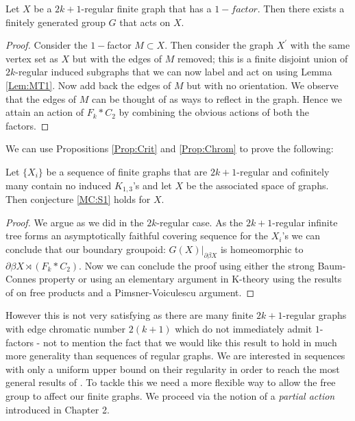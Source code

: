 \begin{proposition}\label{Prop:Chrom}
Let $X$ be a $2k+1$-regular finite graph that has a $1-factor$. Then there exists a finitely generated group $G$ that acts on $X$.
\end{proposition}
\begin{proof}
Consider the $1-$factor $M\subset X$. Then consider the graph $X^{'}$ with the same vertex set as $X$ but with the edges of $M$ removed; this is a finite disjoint union of $2k$-regular induced subgraphs that we can now label and act on using Lemma \ref{Lem:MT1}. Now add back the edges of $M$ but with no orientation. We observe that the edges of $M$ can be thought of as ways to reflect in the graph. Hence we attain an action of $F_{k}\ast C_{2}$ by combining the obvious actions of both the factors. 
\end{proof}

\begin{comment}
\begin{figure}[h]
\texttt{[image: Diagrams/Diagram2.png]}
\caption{Removing a 1-factor and labelling the Pedersen graph.}
\label{Fig:Label}
\end{figure}
\end{comment}

We can use Propositions \ref{Prop:Crit} and \ref{Prop:Chrom} to prove the following:

\begin{theorem}\label{Thm:MR2}
Let $\lbrace X_{i} \rbrace$ be a sequence of finite graphs that are $2k+1$-regular and cofinitely many contain no induced $K_{1,3}$'s and let $X$ be the associated space of graphs. Then conjecture \ref{MC:S1} holds for $X$.
\end{theorem}
\begin{proof}
We argue as we did in the $2k$-regular case. As the $2k+1$-regular infinite tree forms an asymptotically faithful covering sequence for the $X_{i}$'s we can conclude that our boundary groupoid: $G(X)|_{\partial \beta X}$ is homeomorphic to $\partial\beta X\rtimes (F_{k}\ast C_{2})$. Now we can conclude the proof using either the strong Baum-Connes property or using an elementary argument in K-theory using the results of \cite{MR723010} on free products and a Pimsner-Voiculescu argument.
\end{proof}

However this is not very satisfying as there are many finite $2k+1$-regular graphs with edge chromatic number $2(k+1)$ which do not immediately admit $1$-factors - not to mention the fact that we would like this result to hold in much more generality than sequences of regular graphs. We are interested in sequences with only a uniform upper bound on their regularity in order to reach the most general results of \cite{explg1}. To tackle this we need a more flexible way to allow the free group to affect our finite graphs. We proceed via the notion of a \textit{partial action} introduced in Chapter 2.

